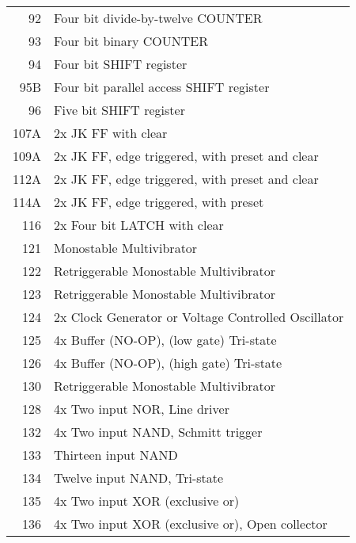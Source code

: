 \begin{tabular}{rl}
92 & Four bit divide-by-twelve COUNTER\\
93 & Four bit binary COUNTER\\
94 & Four bit SHIFT register\\
95B & Four bit parallel access SHIFT register\\
96 & Five bit SHIFT register\\
107A & 2x JK FF with clear\\
109A & 2x JK FF, edge triggered, with preset and clear\\
112A & 2x JK FF, edge triggered, with preset and clear\\
114A & 2x JK FF, edge triggered, with preset\\
116 & 2x Four bit LATCH with clear\\
121 & Monostable Multivibrator\\
122 & Retriggerable Monostable Multivibrator\\
123 & Retriggerable Monostable Multivibrator\\
124 & 2x Clock Generator or Voltage Controlled Oscillator\\
125 & 4x Buffer (NO-OP), (low gate) Tri-state\\
126 & 4x Buffer (NO-OP), (high gate) Tri-state\\
130 & Retriggerable Monostable Multivibrator\\
128 & 4x Two input NOR, Line driver\\
132 & 4x Two input NAND, Schmitt trigger\\
133 & Thirteen input NAND\\
134 & Twelve input NAND, Tri-state\\
135 & 4x Two input XOR (exclusive or)\\
136 & 4x Two input XOR (exclusive or), Open collector\\
\end{tabular}

